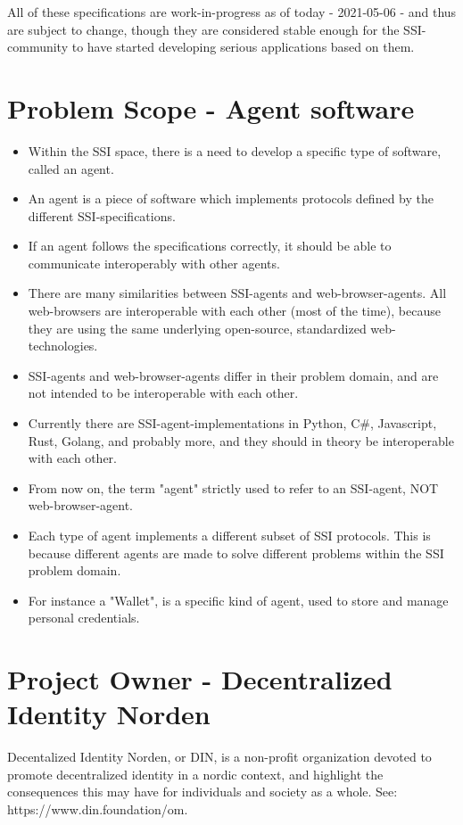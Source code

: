 All of these specifications are work-in-progress as of today - 2021-05-06 - and thus are subject to change, though they are considered stable enough for the SSI-community to have started developing serious applications based on them.

\section{Problem Scope - Agent software} 
\begin{itemize}
    \item Within the SSI space, there is a need to develop a specific type of software, called an agent.
    \item An agent is a piece of software which implements protocols defined by the different SSI-specifications.
    \item If an agent follows the specifications correctly, it should be able to communicate interoperably with other agents.
    \item There are many similarities between SSI-agents and web-browser-agents. All web-browsers are interoperable with each other (most of the time), because they are using the same underlying open-source, standardized web-technologies.
    \item SSI-agents and web-browser-agents differ in their problem domain, and are not intended to be interoperable with each other.
    \item Currently there are SSI-agent-implementations in Python, C#, Javascript, Rust, Golang, and probably more, and they should in theory be interoperable with each other. 
    \item From now on, the term "agent" strictly used to refer to an SSI-agent, NOT web-browser-agent.
    \item Each type of agent implements a different subset of SSI protocols. This is because different agents are made to solve different problems within the SSI problem domain.
    \item For instance a "Wallet", is a specific kind of agent, used to store and manage personal credentials.
\end{itemize}



\section{Project Owner - Decentralized Identity Norden}

Decentalized Identity Norden, or DIN, is a non-profit organization devoted to promote decentralized identity in a nordic context, and highlight the consequences this may have for individuals and society as a whole. See: https://www.din.foundation/om. 

